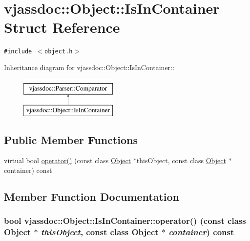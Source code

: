 \hypertarget{structvjassdoc_1_1Object_1_1IsInContainer}{
\section{vjassdoc::Object::IsInContainer Struct Reference}
\label{structvjassdoc_1_1Object_1_1IsInContainer}
}
{\tt \#include $<$object.h$>$}

Inheritance diagram for vjassdoc::Object::IsInContainer::\begin{figure}[H]
\begin{center}
\leavevmode
\includegraphics[height=2cm]{structvjassdoc_1_1Object_1_1IsInContainer}
\end{center}
\end{figure}
\subsection*{Public Member Functions}
\begin{CompactItemize}
\item 
virtual bool \hyperlink{structvjassdoc_1_1Object_1_1IsInContainer_390275d3950a824ad1a9ac025964ef64}{operator()} (const class \hyperlink{classvjassdoc_1_1Object}{Object} $\ast$thisObject, const class \hyperlink{classvjassdoc_1_1Object}{Object} $\ast$container) const 
\end{CompactItemize}


\subsection{Member Function Documentation}
\hypertarget{structvjassdoc_1_1Object_1_1IsInContainer_390275d3950a824ad1a9ac025964ef64}{
\subsubsection{\setlength{\rightskip}{0pt plus 5cm}bool vjassdoc::Object::IsInContainer::operator() (const class {\bf Object} $\ast$ {\em thisObject}, const class {\bf Object} $\ast$ {\em container}) const}}
\label{structvjassdoc_1_1Object_1_1IsInContainer_390275d3950a824ad1a9ac025964ef64}




